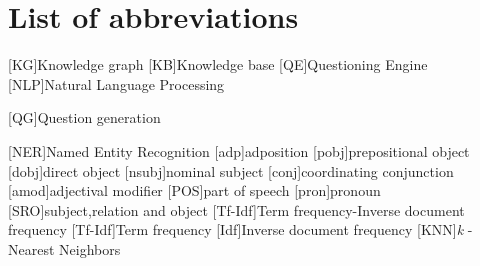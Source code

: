 

\chapter*{List of abbreviations} \label{LOA}
\begin{acronym}
[KG]{Knowledge graph}
[KB]{Knowledge base}
[QE]{Questioning Engine}
[NLP]{Natural Language Processing}

[QG]{Question generation}

[NER]{Named Entity Recognition}
[adp]{adposition}
[pobj]{prepositional object}
[dobj]{direct object}
[nsubj]{nominal subject}
[conj]{coordinating conjunction}
[amod]{adjectival modifier}
[POS]{part of speech}
[pron]{pronoun}
[SRO]{subject,relation and object}
[Tf-Idf]{Term frequency-Inverse document frequency}
[Tf-Idf]{Term frequency}
[Idf]{Inverse document frequency}
[KNN]{\textit{k} -Nearest Neighbors}

\end{acronym}


